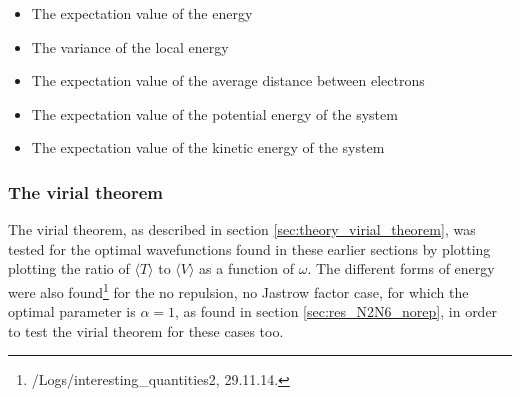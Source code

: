 \begin{itemize}
	\item The expectation value of the energy
	\item The variance of the local energy
	\item The expectation value of the average distance between electrons
	\item The expectation value of the potential energy of the system 
	\item The expectation value of the kinetic energy of the system
\end{itemize}

\subsubsection{The virial theorem }

The virial theorem, as described in section \ref{sec:theory_virial_theorem}, was tested for the optimal wavefunctions found in these earlier sections by plotting plotting the ratio of $\langle T \rangle$ to $\langle V \rangle$ as a function of $\omega$.
 The different forms of energy were also found\footnote{/Logs/interesting\_quantities2, 29.11.14.} for the no repulsion, no Jastrow factor case, for which the optimal parameter is $\alpha = 1$, as found in section \ref{sec:res_N2N6_norep}, in order to test the virial theorem for these cases too. 
